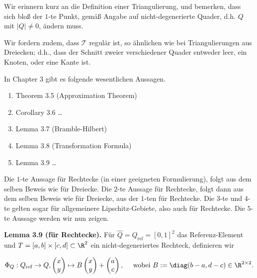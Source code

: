 \begin{solution}

Wir erinnern kurz an die Definition einer Triangulierung, und bemerken, dass sich bloß der $1$-te Punkt, gemäß Angabe auf nicht-degenerierte Quader, d.h. $Q$ mit $|Q| \neq 0$, ändern muss.


Wir fordern zudem, dass $\mathcal{T}$ regulär ist, so ähnlichen wie bei Triangulierungen aus Dreiecken;
d.h., dass der Schnitt zweier verschiedener Quader entweder leer, ein Knoten, oder eine Kante ist.

In Chapter 3 gibt es folgende wesentlichen Aussagen.

\begin{enumerate}[label = \arabic*]
  \item Theorem 3.5 (Approximation Theorem)
  \item Corollary 3.6 \dots {}
  \item Lemma 3.7 (Bramble-Hilbert)
  \item Lemma 3.8 (Transformation Formula)
  \item Lemma 3.9 \dots {}
\end{enumerate}

Die $1$-te Aussage für Rechtecke (in einer geeigneten Formulierung), folgt aus dem selben Beweis wie für Dreiecke.
Die $2$-te Aussage für Rechtecke, folgt dann aus dem selben Beweis wie für Dreiecke, aus der $1$-ten für Rechtecke.
Die $3$-te und $4$-te gelten sogar für allgemeinere Lipschitz-Gebiete, also auch für Rechtecke.
Die $5$-te Aussage werden wir nun zeigen.

\begin{tcolorbox}[standard jigsaw, opacityback = 0]

  \textbf{Lemma 3.9 (für Rechtecke).}
  Für $\hat Q = Q_\mathrm{ref} = [0, 1]^2$ das Referenz-Element und $T = [a, b] \times [c, d] \subset \R^2$ ein nicht-degeneriertes Rechteck, definieren wir

  \begin{align*}
    \Phi_Q:
    Q_\mathrm{ref} \to Q,
    \begin{pmatrix}
      x \\ y
    \end{pmatrix}
    \mapsto
    B
    \begin{pmatrix}
      x \\ y
    \end{pmatrix}
    +
    \begin{pmatrix}
      a \\ c
    \end{pmatrix},
    \quad
    ~\text{wobei}~
    B := \diag(b - a, d - c) \in \R^{2 \times 2}.
  \end{align*}


\end{tcolorbox}
\end{solution}
